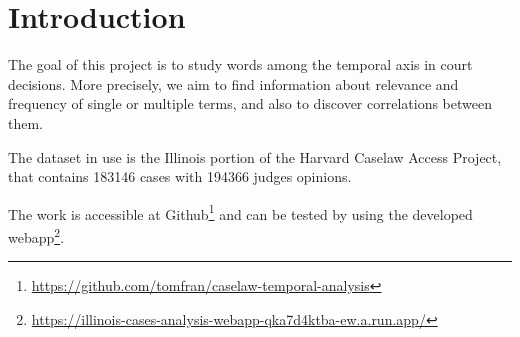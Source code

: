 \section{Introduction}

The goal of this project is to study words among the 
temporal axis in court decisions. 
More precisely, we aim to find information about relevance and 
frequency of single or multiple terms, and also to discover
correlations between them. 

The dataset in use is the Illinois portion of the Harvard Caselaw Access Project, that contains 
183146 cases with 194366 judges opinions. 

The work is accessible at Github\footnote{\url{https://github.com/tomfran/caselaw-temporal-analysis}} and can be
tested by using the developed webapp\footnote{\url{https://illinois-cases-analysis-webapp-qka7d4ktba-ew.a.run.app/}}.